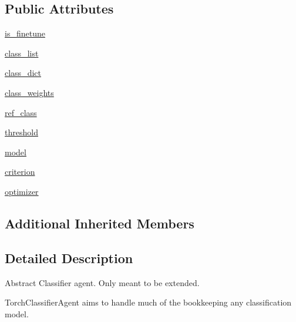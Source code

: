 \subsection*{Public Attributes}
\begin{DoxyCompactItemize}
\item 
\hyperlink{classparlai_1_1core_1_1torch__classifier__agent_1_1TorchClassifierAgent_a9d5bac9fe43ddf4129d486e3061a7a69}{is\+\_\+finetune}
\item 
\hyperlink{classparlai_1_1core_1_1torch__classifier__agent_1_1TorchClassifierAgent_a98e1aad7d454f0ef1a971b60db1bcd18}{class\+\_\+list}
\item 
\hyperlink{classparlai_1_1core_1_1torch__classifier__agent_1_1TorchClassifierAgent_a80b1b3e0162c2dca36a1e1763cf3cad9}{class\+\_\+dict}
\item 
\hyperlink{classparlai_1_1core_1_1torch__classifier__agent_1_1TorchClassifierAgent_ac4c098a9fe13fcbb279cb388059fbdb7}{class\+\_\+weights}
\item 
\hyperlink{classparlai_1_1core_1_1torch__classifier__agent_1_1TorchClassifierAgent_a830ed9662779e824cc9596695b04e985}{ref\+\_\+class}
\item 
\hyperlink{classparlai_1_1core_1_1torch__classifier__agent_1_1TorchClassifierAgent_aba6e1d0ef53762f5930c271c3ae8d63a}{threshold}
\item 
\hyperlink{classparlai_1_1core_1_1torch__classifier__agent_1_1TorchClassifierAgent_acf08c5622edd3627fbe993730f16baa4}{model}
\item 
\hyperlink{classparlai_1_1core_1_1torch__classifier__agent_1_1TorchClassifierAgent_aa59eee6c442bfb02846661fba0904a3d}{criterion}
\item 
\hyperlink{classparlai_1_1core_1_1torch__classifier__agent_1_1TorchClassifierAgent_af7bc3e7b011e16ae3e75617c4773a1a4}{optimizer}
\end{DoxyCompactItemize}
\subsection*{Additional Inherited Members}


\subsection{Detailed Description}
\begin{DoxyVerb}Abstract Classifier agent. Only meant to be extended.

TorchClassifierAgent aims to handle much of the bookkeeping any
classification model.
\end{DoxyVerb}
 

